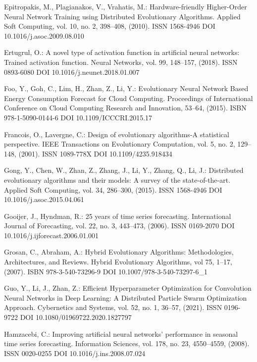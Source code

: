 \begin{thebibliography}{99.}
 Epitropakis, M., Plagianakos, V., Vrahatis, M.: Hardware-friendly Higher-Order Neural Network Training using Distributed Evolutionary Algorithms. Applied Soft Computing, vol. 10, no. 2, 398--408, (2010). ISSN 1568-4946 DOI 10.1016/j.asoc.2009.08.010

 Ertugrul, O.: A novel type of activation function in artificial neural networks: Trained activation function. Neural Networks, vol. 99, 148--157, (2018). ISSN 0893-6080 DOI 10.1016/j.neunet.2018.01.007

 Foo, Y., Goh, C., Lim, H., Zhan, Z., Li, Y.: Evolutionary Neural Network Based Energy Consumption Forecast for Cloud Computing. Proceedings of International Conference on Cloud Computing Research and Innovation, 53--64, (2015). ISBN 978-1-5090-0144-6 DOI 10.1109/ICCCRI.2015.17

 Francois, O., Lavergne, C.: Design of evolutionary algorithms-A statistical perspective. IEEE Transactions on Evolutionary Computation, vol. 5, no. 2, 129--148, (2001). ISSN 1089-778X DOI 10.1109/4235.918434

 Gong, Y., Chen, W., Zhan, Z., Zhang, J., Li, Y., Zhang, Q., Li, J.: Distributed evolutionary algorithms and their models: A survey of the state-of-the-art. Applied Soft Computing, vol. 34, 286--300, (2015). ISSN 1568-4946 DOI 10.1016/j.asoc.2015.04.061

 Gooijer, J., Hyndman, R.: 25 years of time series forecasting. International Journal of Forecasting, vol. 22, no. 3, 443--473, (2006). ISSN 0169-2070 DOI 10.1016/j.ijforecast.2006.01.001

 Grosan, C., Abraham, A.: Hybrid Evolutionary Algorithms: Methodologies, Architectures, and Reviews. Hybrid Evolutionary Algorithms, vol 75, 1--17, (2007). ISBN 978-3-540-73296-9 DOI 10.1007/978-3-540-73297-6\_1

 Guo, Y., Li, J., Zhan, Z.: Efficient Hyperparameter Optimization for Convolution Neural Networks in Deep Learning: A Distributed Particle Swarm Optimization Approach. Cybernetics and Systems, vol. 52, no. 1, 36--57, (2021). ISSN 0196-9722 DOI 10.1080/01969722.2020.1827797

 Hamzacebi, C.: Improving artificial neural networks’ performance in seasonal time series forecasting. Information Sciences, vol. 178, no. 23, 4550--4559, (2008). ISSN 0020-0255 DOI 10.1016/j.ins.2008.07.024


\end{thebibliography}
